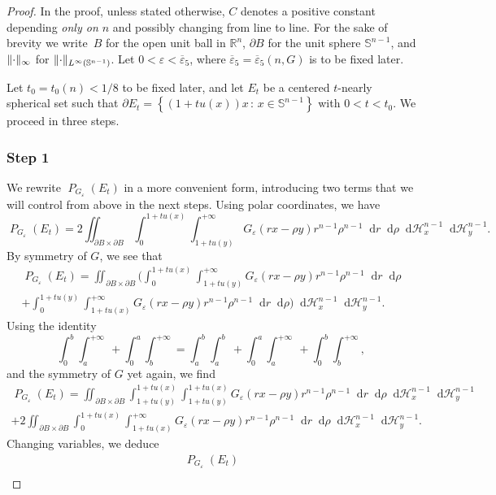 \documentclass[JEP,XML,SOM,Unicode,published]{cedram}
\newcommand{\sep}{\,:\,}
\numberwithin{equation}{section}
\theoremstyle{plain}
\theoremstyle{definition}
\newcommand{\numberset}[1]{{\mathbb{#1}}}
\newcommand{\R}{\numberset{R}}
\newcommand{\dd}{\mathop{}\mathopen{}\mathrm{d}}
\newcommand{\dr}{\mathop{}\mathopen{}\mathrm{d}r}
\newcommand{\dH}{\mathop{}\mathopen{}\mathrm{d}\mathscr{H}}
\newcommand{\bbS}{\mathbb{S}}
\let\eps\varepsilon
\let\ol\overline
\newcommand{\Ren}{{\R^n}}
\DeclareMathOperator{\Per}{\mathit{P}}
\DeclarePairedDelimiter{\norm}{\lVert}{\rVert}
\begin{document}
\begin{proof}
In the proof, unless stated otherwise, $C$ denotes a positive constant depen\-ding \emph{only on
$n$} and possibly changing from line to line.
For the sake of brevity we write~$B$ for the open unit ball in $\Ren$, $\partial B$ for the unit
sphere $\bbS^{n-1}$, and $\norm{\cdot}_{\infty}$ for $\norm{\cdot}_{L^\infty(\bbS^{n-1})}$.
Let $0<\eps<\ol{\eps}_5$, where $\ol{\eps}_5=\ol{\eps}_5(n,G)$ is to be fixed later.

Let $t_0=t_0(n)<1/8$ to be fixed later, and let $E_t$ be a centered $t$-nearly spherical set
such that $\partial E_t=\left\{(1+tu(x))x\sep x\in\bbS^{n-1}\right\}$ with $0<t<t_0$. We proceed in three
steps.

\subsubsection*{Step 1} We rewrite $\Per_{G_\eps}(E_t)$ in a more convenient form,
introducing two terms that we will control from above in the next steps. Using polar coordinates, we
have
\[
\Per_{G_\eps}(E_t)=2\iint_{\partial B\times\partial B} \int_0^{1+tu(x)} \int_{1+tu(y)}^{+\infty}
G_\eps(rx-\rho y)r^{n-1}\rho^{n-1}\dr\dd\rho\dH^{n-1}_x\dH^{n-1}_y.
\]
By symmetry of $G$, we see that
\begin{multline*}
\Per_{G_\eps}(E_t)=\iint_{\partial B\times\partial B} \biggl(
\int_0^{1+tu(x)} \int_{1+tu(y)}^{+\infty} G_\eps(rx-\rho y)r^{n-1}\rho^{n-1}\dr\dd\rho\\
+\int_0^{1+tu(y)} \int_{1+tu(x)}^{+\infty} G_\eps(rx-\rho y)r^{n-1}\rho^{n-1}\dr\dd\rho
\biggr)\dH^{n-1}_x\dH^{n-1}_y.
\end{multline*}
Using the identity
\[
\int_0^b \int_a^{+\infty}~+\int_0^a \int_b^{+\infty}=\int_a^b \int_a^b~+\int_0^a \int_a^{+\infty}~
+\int_0^b\int_b^{+\infty},
\]
and the symmetry of $G$ yet again, we find\vspace*{-5pt}
\begin{multline*}
\Per_{G_\eps}(E_t)=\iint_{\partial B\times\partial B}
\int_{1+tu(y)}^{1+tu(x)} \int_{1+tu(y)}^{1+tu(x)} G_\eps(rx-\rho
y)r^{n-1}\rho^{n-1}\dr\dd\rho\dH^{n-1}_x\dH^{n-1}_y\\
+2\iint_{\partial B\times\partial B}\int_0^{1+tu(x)} \int_{1+tu(x)}^{+\infty} G_\eps(rx-\rho
y)r^{n-1}\rho^{n-1}\dr\dd\rho\dH^{n-1}_x\dH^{n-1}_y.
\end{multline*}
Changing variables, we deduce
\begin{multline}\label{fuglede:eq1}
\Per_{G_\eps}(E_t)\\

\end{multline}
\end{proof}
\end{document}
